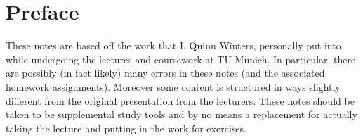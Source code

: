 \documentclass[../notes.tex]{subfile}
\begin{document}
\chapter[Preface]{Preface}\label{chap:Preface}

These notes are based off the work that I, Quinn Winters, personally put into while undergoing the lectures and coursework at TU Munich.
In particular, there are possibly (in fact likely) many errors in these notes (and the associated homework assignments). Moreover 
some content is structured in ways slightly different from the original presentation from the lecturers. These notes should be 
taken to be supplemental study tools and by no means a replacement for actually taking the lecture and putting in the work for exercises. 
\end{document}
